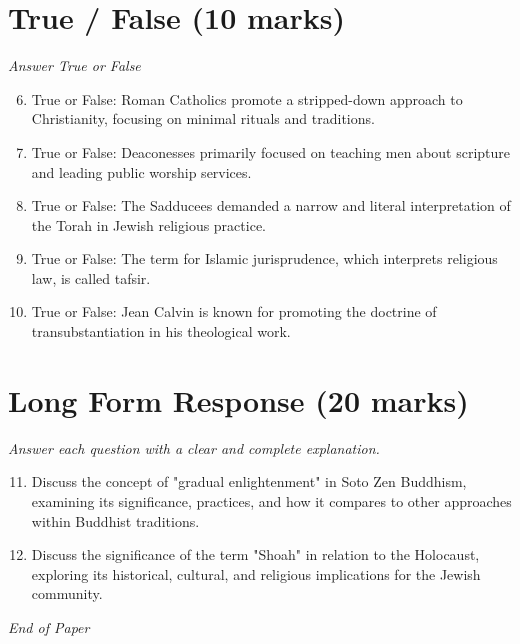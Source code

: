 \documentclass[12pt]{article}
\begin{document}
\section*{True / False (10 marks)}
\textit{Answer True or False}
\begin{enumerate}[label=\arabic*.]
\setcounter{enumi}{5}
\item True or False: Roman Catholics promote a stripped-down approach to Christianity, focusing on minimal rituals and traditions.
\item True or False: Deaconesses primarily focused on teaching men about scripture and leading public worship services.
\item True or False: The Sadducees demanded a narrow and literal interpretation of the Torah in Jewish religious practice.
\item True or False: The term for Islamic jurisprudence, which interprets religious law, is called tafsir.
\item True or False: Jean Calvin is known for promoting the doctrine of transubstantiation in his theological work.
\end{enumerate}

\section*{Long Form Response (20 marks)}
\textit{Answer each question with a clear and complete explanation.}
\begin{enumerate}[label=\arabic*.]
\setcounter{enumi}{10}
\item Discuss the concept of "gradual enlightenment" in Soto Zen Buddhism, examining its significance, practices, and how it compares to other approaches within Buddhist traditions.
\item Discuss the significance of the term "Shoah" in relation to the Holocaust, exploring its historical, cultural, and religious implications for the Jewish community.
\end{enumerate}

\vfill
\noindent\textit{End of Paper}
\end{document}
